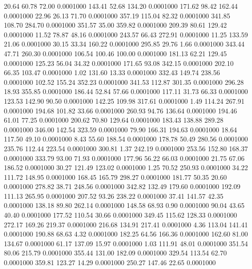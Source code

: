   20.64   60.78   72.00   0.0001000
 143.41   52.68  134.20   0.0001000
 171.62   98.42  162.44   0.0001000
  22.96   26.13   71.70   0.0001000
 357.19  115.04   82.32   0.0001000
 341.85  108.70  284.70   0.0001000
 351.57   35.00  359.82   0.0001000
 209.39   80.61  129.42   0.0001000
  11.52   78.87   48.16   0.0001000
 243.57   66.43  272.91   0.0001000
  11.25  133.59   21.06   0.0001000
  30.15   33.34  160.22   0.0001000
 295.85   29.76    1.66   0.0001000
 343.44   47.71  260.30   0.0001000
 106.54  100.46  100.00   0.0001000
 181.13   62.21  129.45   0.0001000
 125.23   56.04   34.32   0.0001000
 171.65   93.08  342.15   0.0001000
 202.10   66.35  103.47   0.0001000
   1.02  131.60   13.33   0.0001000
 332.43  149.74  238.56   0.0001000
 102.52  155.24  352.23   0.0001000
 341.53  112.87  301.35   0.0001000
 296.28   18.93  355.85   0.0001000
 186.44   52.84   57.66   0.0001000
 117.11   31.73   66.33   0.0001000
 123.53  142.90   90.50   0.0001000
 142.25  109.98  317.61   0.0001000
   1.49  114.24  267.91   0.0001000
 194.68  101.82   33.66   0.0001000
 260.93   94.76  136.64   0.0001000
 194.46   61.01   77.25   0.0001000
 200.62   70.80  129.64   0.0001000
 183.43  138.88  289.28   0.0001000
 346.00  142.54  323.59   0.0001000
  79.90  166.31  194.63   0.0001000
  18.64  117.50   49.10   0.0001000
   8.43   55.60  188.54   0.0001000
 178.78   50.49  280.56   0.0001000
 235.76  112.44  223.54   0.0001000
 300.81    1.37  242.19   0.0001000
 253.56  152.80  168.37   0.0001000
 333.79   93.00   71.93   0.0001000
 177.96   56.22   66.03   0.0001000
  21.75   67.06  186.52   0.0001000
  30.27  121.49  123.02   0.0001000
   1.25   70.52  250.93   0.0001000
  34.22  111.72  148.95   0.0001000
 168.45  165.79  298.27   0.0001000
 181.77   50.35   20.60   0.0001000
 278.82   38.71  248.56   0.0001000
 342.82  132.49  179.60   0.0001000
 192.09  111.13  265.95   0.0001000
 207.52   93.26  238.22   0.0001000
  37.41  141.57   42.35   0.0001000
 138.18   89.80  262.14   0.0001000
 148.58   68.93    0.90   0.0001000
  90.04   43.65   40.40   0.0001000
 177.52  110.54   30.66   0.0001000
 349.45  115.62  128.33   0.0001000
 272.17  169.26  219.37   0.0001000
 216.68  134.91  217.41   0.0001000
   4.36  113.04  141.41   0.0001000
 190.88   68.63    4.32   0.0001000
 182.25   64.56  166.36   0.0001000
 162.60   81.00  134.67   0.0001000
  61.17  137.09   15.97   0.0001000
   1.03  111.91   48.01   0.0001000
 351.54   80.06  215.79   0.0001000
 355.44  131.00  182.09   0.0001000
 329.54  113.54   62.70   0.0001000
 359.81  123.27   14.29   0.0001000
 250.27  147.46   22.65   0.0001000
